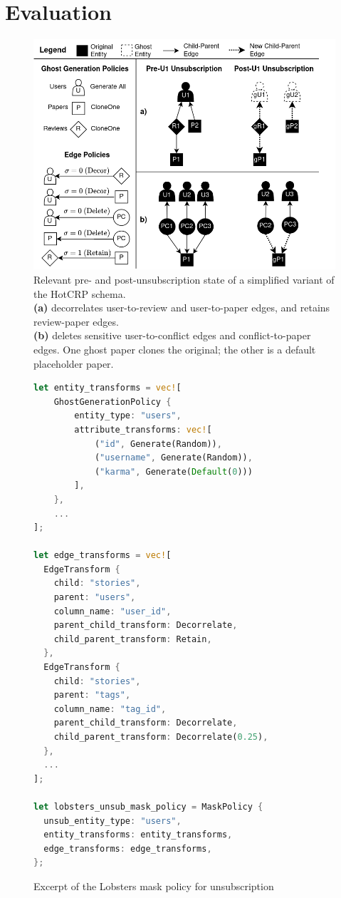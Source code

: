 \section{Evaluation}
\label{sec:hotcrp_example}
\begin{figure}[t!]
    \centering
    \includegraphics[width=.5\textwidth]{img/decor_hotcrp}

    \caption{Relevant pre- and post-unsubscription state of a simplified variant of the HotCRP schema. \\ 
    \textbf{(a)} \sys decorrelates user-to-review and user-to-paper edges, and retains
    review-paper edges. \\%
    \textbf{(b)} \sys deletes sensitive user-to-conflict edges and conflict-to-paper edges. One ghost
    paper clones the original; the other is a default placeholder paper. %
    }
    \label{fig:hotcrp}
\end{figure}

\begin{figure}
\begin{lstlisting}[language=Rust]
let entity_transforms = vec![
    GhostGenerationPolicy {
        entity_type: "users",
        attribute_transforms: vec![
            ("id", Generate(Random)),
            ("username", Generate(Random)),
            ("karma", Generate(Default(0)))
        ],
    },
    ...
];

let edge_transforms = vec![
  EdgeTransform {
    child: "stories",
    parent: "users",
    column_name: "user_id",
    parent_child_transform: Decorrelate,
    child_parent_transform: Retain,
  },
  EdgeTransform {
    child: "stories",
    parent: "tags",
    column_name: "tag_id",
    parent_child_transform: Decorrelate,
    child_parent_transform: Decorrelate(0.25),
  },
  ...
];

let lobsters_unsub_mask_policy = MaskPolicy {
  unsub_entity_type: "users",
  entity_transforms: entity_transforms, 
  edge_transforms: edge_transforms,
};
\end{lstlisting}
    \label{fig:policy}
    \caption{Excerpt of the Lobsters mask policy for unsubscription}
\end{figure}

